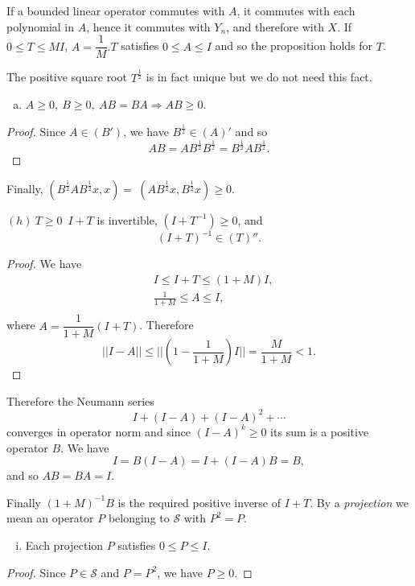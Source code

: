 If a bounded linear operator commutes with $A$, it commutes with each
polynomial in $A$, hence it commutes with $Y_n$, and therefore with
$X$. If $0 \leq T \leq M I$, $A = \dfrac{1}{M}.T$ satisfies $0 \leq A
\leq I$ and so the proposition holds for $T$. 

The positive square root $T^{\frac{1}{2}}$ is in fact unique but we
do not need this fact. 

\begin{enumerate}[(g)]
\item $A \ge 0, ~ B\ge 0, ~ AB = BA \Rightarrow AB \ge 0$.
\end{enumerate}

\begin{proof}
  Since $A \in (B')$, we have $B^{\frac{1}{2}} \in (A)'$ and so 
  $$
  AB = AB^{\frac{1}{2}} B^{\frac{1}{2}} = B^{\frac{1}{2}} AB^{\frac{1}{2}}.
  $$
\end{proof}

Finally, $( B^{\frac{1}{2}}  AB^{\frac{1}{2}} x,x ) = ~ (
AB^{\frac{1}{2}} x, B^{\frac{1}{2}} x) \ge 0$. 

$(h) ~ T \ge 0 \; ~I + T$ is invertible, $(I + T^{-1}) \ge 0$, and 
$$
(I + T)^{-1} \in  (T)''.
$$\pageoriginale

\begin{proof}
  We have  
  \begin{align*}
    & I  \leq I + T \leq (1 + M)I, \\
    & \frac{1}{1+M} \leq A \leq I, \\
  \end{align*}
  where $A = \dfrac{1}{1+M} (I + T)$. Therefore
  $$
  || I - A || \leq || \left(1- \frac{1}{1+M} \right) I || =
  \frac{M}{1+M} < 1. 
  $$
\end{proof}

Therefore the Neumann series
$$
I +  (I- A) + (I - A)^2 + \cdots
$$
converges in operator norm and since $(I- A)^k \ge 0$ its sum is a
positive operator $B$. We have  
$$
I = B (I -A) = I + (I -A) B = B,
$$
and so $AB = BA = I$.

Finally $( 1 + M)^{-1} B$ is the required positive inverse of $I +
T$. By a \textit{ projection } we mean an operator $P$ belonging to
$\mathscr{S}$ with $P^2 = P$. 
\begin{enumerate}[(i)]
\item Each projection $P$ satisfies $0 \leq P \leq I$.
\end{enumerate}

\begin{proof}
  Since $P \in \mathscr{S}$ and $P = P^2$, we have $P \ge 0$.
\end{proof}


